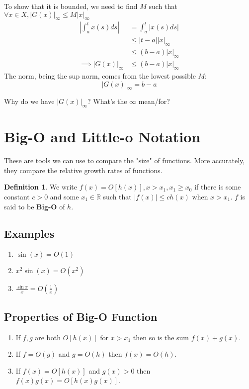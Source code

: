 \documentclass[12pt]{article}
\newcommand{\R}{\mathbb{R}}
\theoremstyle{definition}
\newtheorem{definition}{Definition}[section]
\theoremstyle{remark}
\newenvironment{question}[2][QUESTION]{\begin{trivlist}
\item[\hskip \labelsep {\bfseries #1}\hskip \labelsep {\bfseries #2.}]}{\end{trivlist}}
\begin{document}
To show that it is bounded, we need to find $M$ such that $\forall x\in X, |G(x)|_\infty\leq M|x|_\infty$
\begin{align*}
   \left|\int^t_ax(s)ds\right|&=\int^t_a|x(s)ds|\\
    &\leq |t-a||x|_\infty\\
    &\leq(b-a)|x|_\infty\\
    \implies |G(x)|_\infty &\leq (b-a)|x|_\infty
\end{align*}
The norm, being the sup norm, comes from the lowest possible $M$:
$$|G(x)|_\infty = b-a$$
\begin{question}{6}
    Why do we have $|G(x)|_\infty$? What's the $\infty$ mean/for?\vspace{2in}
\end{question}{6}

\section{Big-O and Little-o Notation}
These are tools we can use to compare the "size" of functions. More accurately, they compare the relative growth rates of functions.

\begin{definition}
   We write $f(x)=O[h(x)], x>x_1, x_1\geq x_0$ if there is some constant $c>0$ and some $x_1\in\R$ such that $|f(x)|\leq c h(x)$ when $x>x_1$. $f$ is said to be \textbf{Big-O} of $h$.
\end{definition}
\subsection{Examples}
\begin{enumerate}
   \item $\sin(x)=O(1)$
   \item $x^2\sin(x)=O(x^2)$
   \item $\frac{\sin x}{x}=O(\frac{1}{x})$ 
\end{enumerate}
\subsection{Properties of Big-O Function}
\begin{enumerate}
    \item If $f,g$ are both $O[h(x)]$ for $x>x_1$ then so is the sum $f(x)+g(x)$.
    \item If $f=O(g)$ and $g=O(h)$ then $f(x)=O(h)$.
    \item If $f(x)=O[h(x)]$ and $g(x)>0$ then $f(x)g(x)=O[h(x)g(x)]$.
\end{enumerate}
\end{document}
